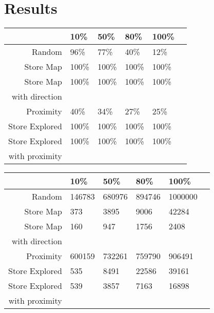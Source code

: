 \documentclass[letterpaper]{article}
\begin{document}
\section{Results}
\begin{tabular}{ r | l l l l l }  
					& 10\%		& 50\%		& 80\%		& 100\%		\\
	\midrule
	Random			& 96\% 		& 77\% 		& 40\%		& 12\%		\\
	Store Map		& 100\%		& 100\% 	& 100\%  	& 100\% 	\\
	Store Map 		& 100\%		& 100\% 	& 100\%  	& 100\% 	\\
	with direction \\
	Proximity		& 40\%		& 34\% 		& 27\%  	& 25\% 		\\
	Store Explored 	& 100\%		& 100\% 	& 100\%  	& 100\% 	\\
	Store Explored 	& 100\%		& 100\% 	& 100\%  	& 100\% 	\\
	with proximity 	\\
\end{tabular}

\begin{tabular}{ r | l l l l l }  
					& 10\%		& 50\%		& 80\%		& 100\%		\\
	\midrule
	Random			& 146783 	& 680976 	& 894746 	& 1000000	\\
	Store Map		& 373		& 3895 		& 9006  	& 42284 	\\
	Store Map 		& 160		& 947 		& 1756 		& 2408		\\
	with direction \\
	Proximity		& 600159	& 732261 	& 759790 	& 906491	\\
	Store Explored 	& 535		& 8491		& 22586		& 39161		\\
	Store Explored 	& 539		& 3857 		& 7163 		& 16898		\\	
	with proximity 	\\
\end{tabular}
\end{document}
